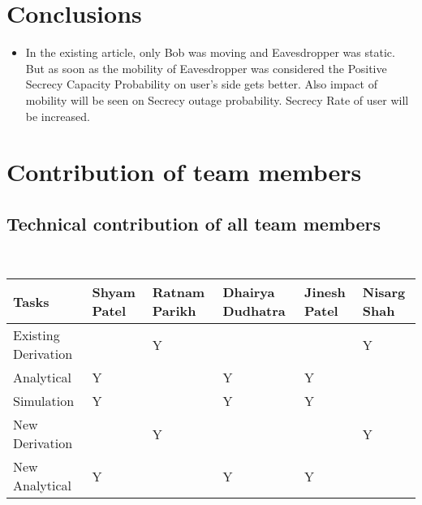 \documentclass{article}
\begin{document}
	
\section{Conclusions}
	
\begin{itemize}
	
\item In the existing article, only Bob was moving and Eavesdropper was static. But as soon as the mobility of Eavesdropper was considered the Positive Secrecy Capacity Probability on user's side gets better.
Also impact of mobility will be seen on Secrecy outage probability. Secrecy Rate of user will be increased. 
\end{itemize}


\section{ Contribution of team members}	
\subsection{Technical contribution of all team members }
 \\
\begin{table}[h]
\centering
\begin{tabular}{|l|l|l|l|l|l|}
\hline
\textbf{Tasks} & \textbf{Shyam Patel} & \textbf{Ratnam Parikh} & \textbf{Dhairya Dudhatra} & \textbf{Jinesh Patel} & \textbf{Nisarg Shah} \\ \hline
Existing Derivation      &                       &         Y               &          &                        &         Y                             \\ \hline
Analytical       &     Y                   &                        &    Y      &       Y                 &                                      \\ \hline
Simulation          &      Y                  &                        &    Y      &        Y                &                                      \\ \hline
New Derivation        &                        &                 Y       &          &                        &      Y                                \\ \hline
New Analytical        &   Y                     &                        &      Y    & Y                       &                                      \\ \hline
\end{tabular}
\end{table}
\newpage
\end{document}
